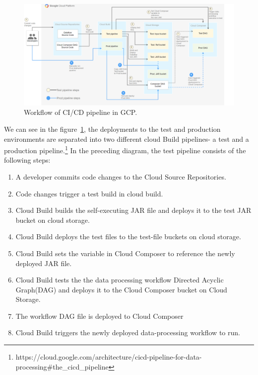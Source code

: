 \begin{figure}[h]
    \centering
    \includegraphics[scale=0.53]{images/cicd-pipeline-for-data-processing-1-diagram-pipeline.png}
    \caption{Workflow of CI/CD pipeline in GCP.} 
    \label{fig:gcp_cicd}
\end{figure}
%
We can see in the figure~\ref{fig:gcp_cicd},  the deployments to the test and production environments are separated into two different cloud Build pipelines- a test and a production pipeline.\footnote{https://cloud.google.com/architecture/cicd-pipeline-for-data-processing\#the\_cicd\_pipeline} 
\newline     In the preceding diagram, the test pipeline consists of the following steps: 
\begin{enumerate}
    \item A developer commits code changes to the Cloud Source Repositories. 
    \item Code changes trigger a test build in cloud build.
    \item Cloud Build builds the self-executing JAR file and deploys it to the test JAR bucket on cloud storage. 
    \item Cloud Build deploys the test files to the test-file buckets on cloud storage.
    \item Cloud Build sets the variable in Cloud Composer to reference the newly deployed JAR file. 
    \item Cloud Build tests the the data processing workflow Directed Acyclic Graph(DAG) and deploys it to the Cloud Composer bucket on Cloud Storage.
    \item The workflow DAG file is deployed to Cloud Composer 
    \item Cloud Build triggers the newly deployed data-processing workflow to run. 
\end{enumerate}

